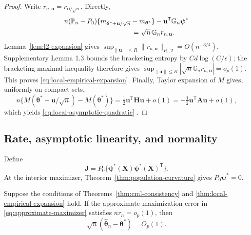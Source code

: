 \begin{proof}
Write $r_{n,\mathbf u}=r_{\mathbf u/\sqrt n}$. Directly,
\begin{align*}
 &n(\mathbb P_n-P_0)\{m_{\boldsymbol\theta^*+\mathbf u/\sqrt n}
                       -m_{\boldsymbol\theta^*}\}
 -\mathbf u^\mathsf T\mathbb G_n\boldsymbol\psi^*\\
 &\hspace{35mm}=\sqrt n\,\mathbb G_n r_{n,\mathbf u}.
\end{align*}
Lemma~\ref{lem:l2-expansion} gives
$\sup_{\|\mathbf u\|\leq R}\|r_{n,\mathbf u}\|_{P_0,2}=O(n^{-3/4})$.
Supplementary Lemma 1.3 bounds the bracketing entropy by
$C d\log(C/\epsilon)$; the bracketing maximal inequality therefore gives
$\sup_{\|\mathbf u\|\leq R}|\sqrt n\mathbb G_nr_{n,\mathbf u}|=o_p(1)$.
This proves \eqref{eq:local-empirical-expansion}. Finally, Taylor expansion of
$M$ gives, uniformly on compact sets,
\[
 n\{M(\boldsymbol\theta^*+\mathbf u/\sqrt n)-M(\boldsymbol\theta^*)\}
 =\tfrac12\mathbf u^\mathsf T\mathbf H\mathbf u+o(1)
 =-\tfrac12\mathbf u^\mathsf T\mathbf A\mathbf u+o(1),
\]
which yields \eqref{eq:local-asymptotic-quadratic}
\citep{vandervaart1998,van1996weak}.
\end{proof}

\subsection{Rate, asymptotic linearity, and normality}

Define
\begin{equation}
 \mathbf{J}=P_0\{\boldsymbol{\psi}^*(\mathbf{X})\boldsymbol{\psi}^*(\mathbf{X})^\mathsf T\}.
 \label{eq:score-variance}
\end{equation}
At the interior maximizer, Theorem~\ref{thm:population-curvature} gives
$P_0\boldsymbol{\psi}^*=0$.

\begin{theorem}
\label{thm:root-n-rate}
Suppose the conditions of Theorems~\ref{thm:cml-consistency} and
\ref{thm:local-empirical-expansion} hold.  If the approximate-maximization
error in \eqref{eq:approximate-maximizer} satisfies $nr_n=o_p(1)$, then
\begin{equation}
 \sqrt n(\widehat{\boldsymbol{\theta}}_n-\boldsymbol{\theta}^*)=O_p(1).
 \label{eq:root-n-rate}
\end{equation}
\end{theorem}

